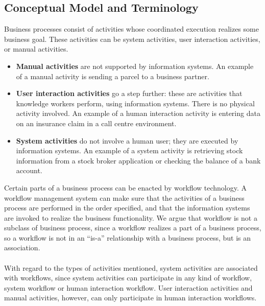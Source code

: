 \documentclass[10pt,a4paper]{article}
\begin{document}
\subsection{Conceptual Model and Terminology}
Business processes consist of activities whose coordinated execution realizes some business goal. These activities can be system activities, user interaction activities, or manual activities. 
\begin{itemize}
	\item \textbf{Manual activities} are not supported by information systems. An example of a manual activity is sending a parcel to a business partner. 
	\item \textbf{User interaction activities} go a step further: these are activities that knowledge workers perform, using information systems. There is no physical activity involved. An example of a human interaction activity is entering data on an insurance claim in a call centre environment.
	\item \textbf{System activities} do not involve a human user; they are executed by information systems. An example of a system activity is retrieving stock information from a stock broker application or checking the balance of a bank account.
\end{itemize}
Certain parts of a business process can be enacted by workflow technology. A workflow management system can make sure that the activities of a business process are performed in the order specified, and that the information systems are invoked to realize the business functionality. We argue that workflow is not a subclass of business process, since a workflow realizes a part of a business process, so a workflow is not in an “is-a” relationship with a business process, but is an association. \\ \\
With regard to the types of activities mentioned, system activities are associated with workflows, since system activities can participate in any kind of workflow, system workflow or human interaction workflow. User interaction activities and manual activities, however, can only participate in human interaction workflows.
\end{document}
